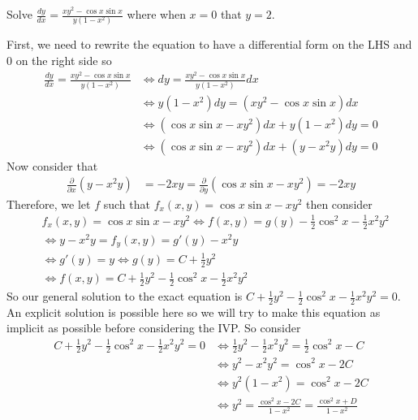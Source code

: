 \documentclass[notes]{subfiles}
\begin{document}
\begin{exercise}
    Solve $\frac{dy}{dx} = \frac{xy^2 - \cos x \sin x}{y(1 - x^2)}$ where when $x = 0$ that $y = 2$.
\end{exercise}
\begin{solution}
    First, we need to rewrite the equation to have a differential form on the LHS and $0$ on the right side so
    \begin{align*}
        \frac{dy}{dx} = \frac{xy^2 - \cos x \sin x}{y(1 - x^2)}
        &\iff dy = \frac{xy^2 - \cos x\sin x}{y(1 - x^2)}dx \\
        &\iff y(1 - x^2)dy = (xy^2 - \cos x\sin x)dx \\
        &\iff (\cos x\sin x - xy^2)dx + y(1 - x^2)dy = 0 \\
        &\iff (\cos x\sin x - xy^2)dx + (y - x^2 y)dy = 0
    \end{align*}
    Now consider that
    \begin{align*}
        \frac{\partial}{\partial x} (y - x^2 y)
        &= -2xy
        = \frac{\partial}{\partial y}(\cos x\sin x - xy^2) = -2xy
    \end{align*}
    Therefore, we let $f$ such that $f_x(x, y) = \cos x\sin x - xy^2$ then consider
    \begin{align*}
        &f_x(x, y) = \cos x\sin x - xy^2
        \iff f(x, y) = g(y) - \frac{1}{2}\cos^2 x - \frac{1}{2} x^2 y^2 \\
        &\iff y - x^2 y = f_y(x, y) = g'(y) - x^2 y \\
        &\iff g'(y) = y
        \iff g(y) = C + \frac{1}{2}y^2 \\
        &\iff f(x, y) = C + \frac{1}{2}y^2 - \frac{1}{2}\cos^2 x - \frac{1}{2} x^2 y^2
    \end{align*}
    So our general solution to the exact equation is $C + \frac{1}{2}y^2 - \frac{1}{2}\cos^2 x - \frac{1}{2} x^2 y^2 = 0$. \\
    An explicit solution is possible here so we will try to make this equation as implicit as possible before considering the IVP. So consider
    \begin{align*}
        C + \frac{1}{2}y^2 - \frac{1}{2}\cos^2 x - \frac{1}{2} x^2 y^2 = 0
        &\iff \frac{1}{2}y^2 - \frac{1}{2} x^2 y^2 = \frac{1}{2}\cos^2 x - C \\
        &\iff y^2 - x^2 y^2 = \cos^2 x - 2C \\
        &\iff y^2(1 - x^2) = \cos^2 x - 2C \\
        &\iff y^2 = \frac{\cos^2 x - 2C}{1 - x^2} = \frac{\cos^2 x + D}{1 - x^2}

\end{align*}
\end{solution}
\end{document}
